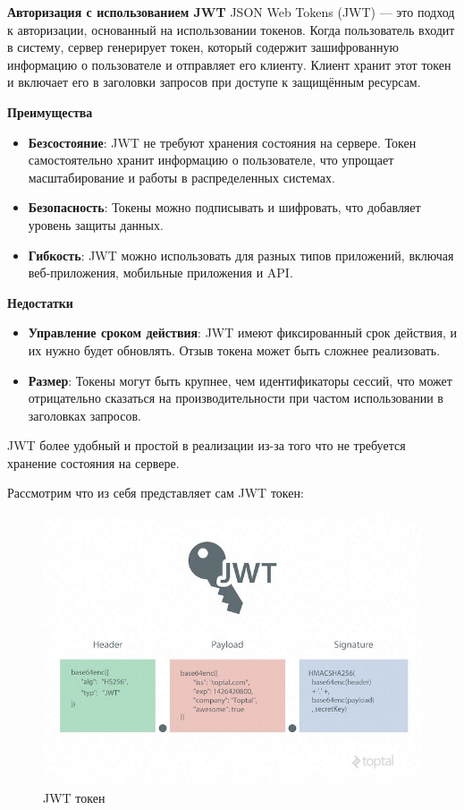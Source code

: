 \textbf{Авторизация с использованием JWT}
JSON Web Tokens (JWT) — это подход к авторизации, основанный на использовании токенов\cite{bryan2021web}. Когда пользователь 
входит в систему, сервер генерирует токен, который содержит зашифрованную информацию о пользователе и отправляет 
его клиенту. Клиент хранит этот токен и включает его в заголовки запросов при доступе к защищённым ресурсам.

\textbf{Преимущества}
\begin{itemize}
    \item \textbf{Безсостояние}: JWT не требуют хранения состояния на сервере. Токен самостоятельно хранит информацию о пользователе, что упрощает масштабирование и работы в распределенных системах.
    \item \textbf{Безопасность}: Токены можно подписывать и шифровать, что добавляет уровень защиты данных.
    \item \textbf{Гибкость}: JWT можно использовать для разных типов приложений, включая веб-приложения, мобильные приложения и API.
\end{itemize}

\textbf{Недостатки}
\begin{itemize}
    \item \textbf{Управление сроком действия}: JWT имеют фиксированный срок действия, и их нужно будет обновлять. Отзыв токена может быть сложнее реализовать.
    \item \textbf{Размер}: Токены могут быть крупнее, чем идентификаторы сессий, что может отрицательно сказаться на производительности при частом использовании в заголовках запросов.
\end{itemize}

JWT более удобный и простой в реализации из-за того что не требуется хранение состояния на сервере.

Рассмотрим что из себя представляет сам JWT токен:

\begin{figure}[H]%
	\begin{center}
		\includegraphics[width=.6\columnwidth]{./img/new/jwt_token.png}%
	\end{center}
	\caption{JWT токен}%
	\label{pic:jwt_token}%
\end{figure}

